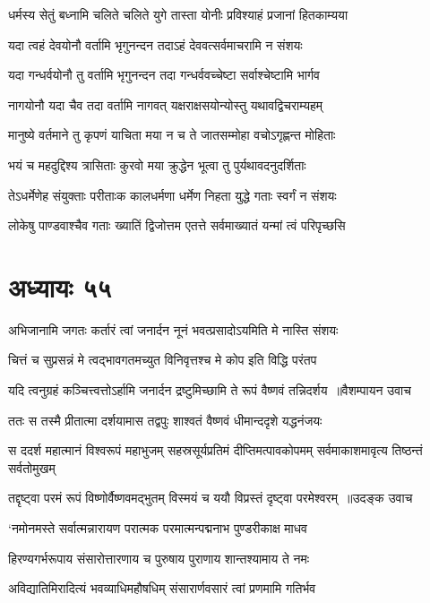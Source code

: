 \twolineshloka
{धर्मस्य सेतुं बध्नामि चलिते चलिते युगे}
{तास्ता योनीः प्रविश्याहं प्रजानां हितकाम्यया}


\twolineshloka
{यदा त्वहं देवयोनौ वर्तामि भृगुनन्दन}
{तदाऽहं देववत्सर्वमाचरामि न संशयः}


\twolineshloka
{यदा गन्धर्वयोनौ तु वर्तामि भृगुनन्दन}
{तदा गन्धर्ववच्चेष्टा सर्वाश्चेष्टामि भार्गव}


\twolineshloka
{नागयोनौ यदा चैव तदा वर्तामि नागवत्}
{यक्षराक्षसयोन्योस्तु यथावद्विचराम्यहम्}


\twolineshloka
{मानुष्ये वर्तमाने तु कृपणं याचिता मया}
{न च ते जातसम्मोहा वचोऽगृह्णन्त मोहिताः}


\twolineshloka
{भयं च महदुद्दिश्य त्रासिताः कुरवो मया}
{क्रुद्धेन भूत्वा तु पुर्यथावदनुदर्शिताः}


\twolineshloka
{तेऽधर्मेणेह संयुक्ताः परीताःक कालधर्मणा}
{धर्मेण निहता युद्धे गताः स्वर्गं न संशयः}


\twolineshloka
{लोकेषु पाण्डवाश्चैव गताः ख्यातिं द्विजोत्तम}
{एतत्ते सर्वमाख्यातं यन्मां त्वं परिपृच्छसि}


\chapter{अध्यायः ५५}
\twolineshloka
{अभिजानामि जगतः कर्तारं त्वां जनार्दन}
{नूनं भवत्प्रसादोऽयमिति मे नास्ति संशयः}


\twolineshloka
{चित्तं च सुप्रसन्नं मे त्वद्भावगतमच्युत}
{विनिवृत्तश्च मे कोप इति विद्धि परंतप}


\threelineshloka
{यदि त्वनुग्रहं कञ्चित्त्वत्तोऽर्हामि जनार्दन}
{द्रष्टुमिच्छामि ते रूपं वैष्णवं तन्निदर्शय ॥वैशम्पायन उवाच}
{}


\twolineshloka
{ततः स तस्मै प्रीतात्मा दर्शयामास तद्वपुः}
{शाश्वतं वैष्णवं धीमान्ददृशे यद्धनंजयः}


\threelineshloka
{स ददर्श महात्मानं विश्वरूपं महाभुजम्}
{सहस्रसूर्यप्रतिमं दीप्तिमत्पावकोपमम्}
{सर्वमाकाशमावृत्य तिष्ठन्तं सर्वतोमुखम्}


\threelineshloka
{तद्दृष्ट्वा परमं रूपं विष्णोर्वैष्णवमद्भुतम्}
{विस्मयं च ययौ विप्रस्तं दृष्ट्वा परमेश्वरम् ॥उदङ्क उवाच}
{}


\twolineshloka
{`नमोनमस्ते सर्वात्मन्नारायण परात्मक}
{परमात्मन्पद्मनाभ पुण्डरीकाक्ष माधव}


\twolineshloka
{हिरण्यगर्भरूपाय संसारोत्तारणाय च}
{पुरुषाय पुराणाय शान्तश्यामाय ते नमः}


\twolineshloka
{अविद्यातिमिरादित्यं भवव्याधिमहौषधिम्}
{संसारार्णवसारं त्वां प्रणमामि गतिर्भव}



